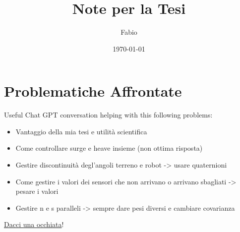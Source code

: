 \documentclass[12pt,a4paper]{article}
\title{Note per la Tesi}
\author{Fabio}
\date{\today}
\begin{document}
\maketitle

\section{Problematiche Affrontate}

Useful Chat GPT conversation helping with this following problems:\\
\begin{itemize}
    \item Vantaggio della mia tesi e utilità scientifica\\
    \item Come controllare surge e heave insieme (non ottima risposta)\\
    \item Gestire discontinuità degl'angoli terreno e robot -> usare quaternioni\\
    \item Come gestire i valori dei sensori che non arrivano o arrivano sbagliati -> pesare i valori\\
    \item Gestire n e s paralleli -> sempre dare pesi diversi e cambiare covarianza\\
\end{itemize}

\href{https://chatgpt.com/share/686d001f-fa28-8004-a8b7-eec4cea88c3a}{Dacci una occhiata}!
\end{document}

